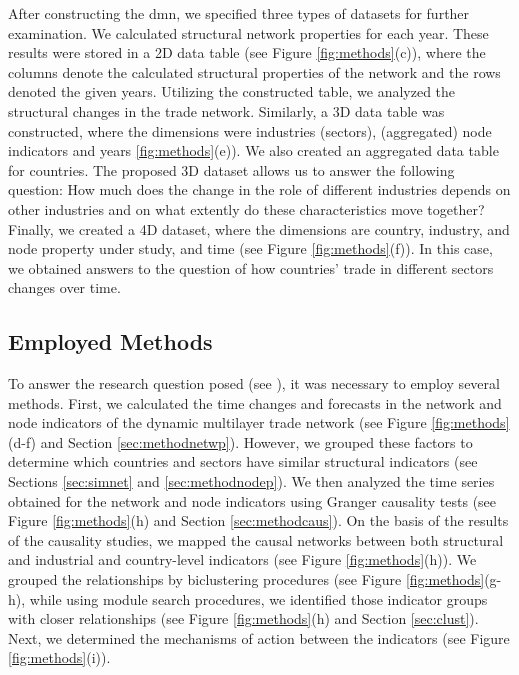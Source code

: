 \documentclass[preprint, 3p,
authoryear]{elsarticle} %
\begin{document}
After constructing the \gls{dmn}, we specified three types of datasets
for further examination. We calculated structural network properties for
each year. These results were stored in a 2D data table (see Figure
\ref{fig:methods}(c)), where the columns denote the calculated
structural properties of the network and the rows denoted the given
years. Utilizing the constructed table, we analyzed the structural
changes in the trade network. Similarly, a 3D data table was
constructed, where the dimensions were industries (sectors),
(aggregated) node indicators and years \ref{fig:methods}(e)). We also
created an aggregated data table for countries. The proposed 3D dataset
allows us to answer the following question: How much does the change in
the role of different industries depends on other industries and on what
extently do these characteristics move together? Finally, we created a
4D dataset, where the dimensions are country, industry, and node
property under study, and time (see Figure \ref{fig:methods}(f)). In
this case, we obtained answers to the question of how countries' trade
in different sectors changes over time.

\subsection{Employed Methods}\label{employed-methods}

To answer the research question posed (see ), it was
necessary to employ several methods. First, we calculated the time
changes and forecasts in the network and node indicators of the dynamic
multilayer trade network (see Figure \ref{fig:methods}(d-f) and Section
\ref{sec:methodnetwp}). However, we grouped these factors to determine
which countries and sectors have similar structural indicators (see
Sections \ref{sec:simnet} and \ref{sec:methodnodep}). We then analyzed
the time series obtained for the network and node indicators using
Granger causality tests (see Figure \ref{fig:methods}(h) and Section
\ref{sec:methodcaus}). On the basis of the results of the causality
studies, we mapped the causal networks between both structural and
industrial and country-level indicators (see Figure
\ref{fig:methods}(h)). We grouped the relationships by biclustering
procedures (see Figure \ref{fig:methods}(g-h), while using module search
procedures, we identified those indicator groups with closer
relationships (see Figure \ref{fig:methods}(h) and Section
\ref{sec:clust}). Next, we determined the mechanisms of action between
the indicators (see Figure \ref{fig:methods}(i)).
\end{document}
